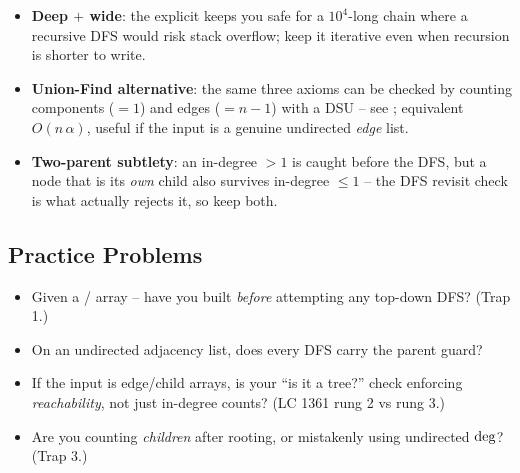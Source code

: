 \begin{hardeningbox}
\begin{itemize}[nosep, leftmargin=1.4em]
  \item \textbf{Deep $+$ wide}: the explicit  keeps you safe for a $10^4$-long
        chain where a recursive DFS would risk stack overflow; keep it iterative even when
        recursion is shorter to write.
  \item \textbf{Union-Find alternative}: the same three axioms can be checked by counting
        components ($=1$) and edges ($=n-1$) with a DSU -- see ; equivalent
        $O(n\,\alpha)$, useful if the input is a genuine undirected \emph{edge} list.
  \item \textbf{Two-parent subtlety}: an in-degree $>1$ is caught before the DFS, but a
        node that is its \emph{own} child also survives in-degree $\le1$ -- the DFS
        revisit check is what actually rejects it, so keep both.
\end{itemize}
\end{hardeningbox}

\subsection{Practice Problems}

\begin{stuckbox}
\begin{itemize}[nosep, leftmargin=1.4em]
  \item Given a / array -- have you built 
        \emph{before} attempting any top-down DFS? (Trap 1.)
  \item On an undirected adjacency list, does every DFS carry the parent guard?
  \item If the input is edge/child arrays, is your ``is it a tree?'' check enforcing
        \emph{reachability}, not just in-degree counts? (LC 1361 rung 2 vs rung 3.)
  \item Are you counting \emph{children} after rooting, or mistakenly using undirected
        $\operatorname{deg}$? (Trap 3.)
\end{itemize}
\end{stuckbox}

